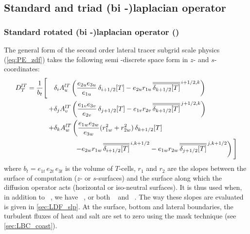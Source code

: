 \documentclass[../main/NEMO_manual]{subfiles}
\begin{document}
\subsection{Standard and triad (bi -)laplacian operator}
\label{subsec:TRA_ldf_iso_triad}

\subsubsection{Standard rotated (bi -)laplacian operator (\protect{})}
\label{subsec:TRA_ldf_iso}
The general form of the second order lateral tracer subgrid scale physics (\autoref{eq:PE_zdf})
takes the following semi -discrete space form in $z$- and $s$-coordinates:
\begin{equation}
  \label{eq:tra_ldf_iso}
  \begin{split}
    D_T^{lT} = \frac{1}{b_t} \Bigg[ \quad &\delta_i A_u^{lT} \left( \frac{e_{2u} e_{3u}}{e_{1u}}                      \, \delta_{i + 1/2} [T]
                                                                  - e_{2u} r_{1u} \, \overline{\overline{\delta_{k + 1/2} [T]}}^{\,i + 1/2,k} \right) \Bigg. \\
                                    +     &\delta_j A_v^{lT} \left( \frac{e_{1v} e_{3v}}{e_{2v}}                       \, \delta_{j + 1/2} [T]
                                                                  - e_{1v} r_{2v} \, \overline{\overline{\delta_{k + 1/2} [T]}}^{\,j + 1/2,k} \right)        \\
                                   +     &\delta_k A_w^{lT} \left( \frac{e_{1w} e_{2w}}{e_{3w}} (r_{1w}^2 + r_{2w}^2) \, \delta_{k + 1/2} [T] \right.           \\
                                   & \qquad \quad \Bigg. \left.     - e_{2w} r_{1w} \, \overline{\overline{\delta_{i + 1/2} [T]}}^{\,i,k + 1/2}
                                                                  - e_{1w} r_{2w} \, \overline{\overline{\delta_{j + 1/2} [T]}}^{\,j,k + 1/2} \right) \Bigg]
  \end{split}
\end{equation}
where $b_t = e_{1t} \, e_{2t} \, e_{3t}$  is the volume of $T$-cells,
$r_1$ and $r_2$ are the slopes between the surface of computation ($z$- or $s$-surfaces) and
the surface along which the diffusion operator acts (\ie horizontal or iso-neutral surfaces).
It is thus used when, in addition to ~,
we have ~,
or both ~ and ~.
The way these slopes are evaluated is given in \autoref{sec:LDF_slp}.
At the surface, bottom and lateral boundaries, the turbulent fluxes of heat and salt are set to zero using
the mask technique (see \autoref{sec:LBC_coast}).
\end{document}
